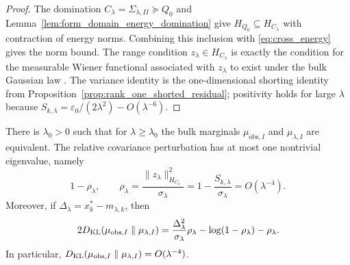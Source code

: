 \begin{proof}
The domination $C_\lambda=\Sigma_{\lambda,II}\succeq Q_0$ and
Lemma~\ref{lem:form_domain_energy_domination} give
$H_{Q_0}\subseteq H_{C_\lambda}$ with contraction of energy norms.  Combining
this inclusion with \eqref{eq:cross_energy} gives the norm bound.  The range
condition $z_\lambda\in H_{C_\lambda}$ is exactly the condition for the
measurable Wiener functional associated with $z_\lambda$ to exist under the bulk
Gaussian law \cite{bogachev1998gaussian,steinwart2024conditioning}.  The variance identity is the
one-dimensional shorting identity from Proposition~\ref{prop:rank_one_shorted_residual};
positivity holds for large $\lambda$ because
$S_{k,\lambda}=\varepsilon_0/(2\lambda^2)-O(\lambda^{-6})$.
\end{proof}

\begin{lemma}
\label{lem:feldman_hajek}
There is $\lambda_0>0$ such that for $\lambda\ge\lambda_0$ the bulk marginals
$\mu_{\mathrm{obs},I}$ and $\mu_{\lambda,I}$ are equivalent.  The relative
covariance perturbation has at most one nontrivial eigenvalue, namely
\begin{equation}
  1-\rho_\lambda,
  \qquad
  \rho_\lambda
  =
  \frac{\|z_\lambda\|_{H_{C_\lambda}}^2}{\sigma_\lambda}
  =
  1-\frac{S_{k,\lambda}}{\sigma_\lambda}
  =O(\lambda^{-4}).
  \label{eq:rho_lambda_rank_one}
\end{equation}
Moreover, if $\Delta_\lambda=x_k^*-m_{\lambda,k}$, then
\begin{equation}
  2D_{\operatorname{KL}}(\mu_{\mathrm{obs},I}\parallel\mu_{\lambda,I})
  =
  \frac{\Delta_\lambda^2}{\sigma_\lambda}\rho_\lambda
  -\log(1-\rho_\lambda)-\rho_\lambda.
  \label{eq:bulk_KL_rank_one}
\end{equation}
In particular,
$D_{\operatorname{KL}}(\mu_{\mathrm{obs},I}\parallel\mu_{\lambda,I})=O(\lambda^{-4})$.
\end{lemma}

